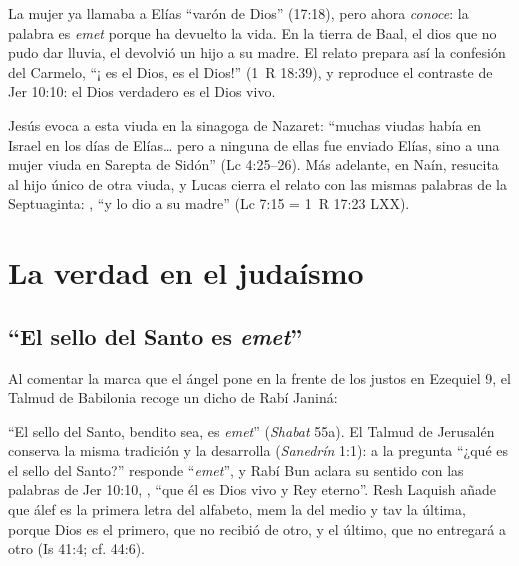 La mujer ya llamaba a Elías ``varón de Dios'' (17:18), pero ahora \emph{conoce}: la palabra es \emph{emet} porque ha devuelto la vida. En la tierra de Baal, el dios que no pudo dar lluvia, el \SENOR{} devolvió un hijo a su madre. El relato prepara así la confesión del Carmelo, ``¡\SENOR{} es el Dios, \SENOR{} es el Dios!'' (1~R 18:39), y reproduce el contraste de Jer 10:10: el Dios verdadero es el Dios vivo.

Jesús evoca a esta viuda en la sinagoga de Nazaret: ``muchas viudas había en Israel en los días de Elías\ldots{} pero a ninguna de ellas fue enviado Elías, sino a una mujer viuda en Sarepta de Sidón'' (Lc 4:25--26). Más adelante, en Naín, resucita al hijo único de otra viuda, y Lucas cierra el relato con las mismas palabras de la Septuaginta: , ``y lo dio a su madre'' (Lc 7:15 = 1~R 17:23 LXX).


\section{La verdad en el judaísmo}\label{sec:judaismo-verdad}

\subsection{“El sello del Santo es \emph{emet}”}
Al comentar la marca que el ángel pone en la frente de los justos en Ezequiel 9, el Talmud de Babilonia recoge un dicho de Rabí Janiná:


``El sello del Santo, bendito sea, es \emph{emet}'' (\emph{Shabat} 55a). El Talmud de Jerusalén conserva la misma tradición y la desarrolla (\emph{Sanedrín} 1:1): a la pregunta ``¿qué es el sello del Santo?'' responde ``\emph{emet}'', y Rabí Bun aclara su sentido con las palabras de Jer 10:10, , ``que él es Dios vivo y Rey eterno''. Resh Laquish añade que álef es la primera letra del alfabeto, mem la del medio y tav la última, porque Dios es el primero, que no recibió de otro, y el último, que no entregará a otro (Is 41:4; cf. 44:6).

